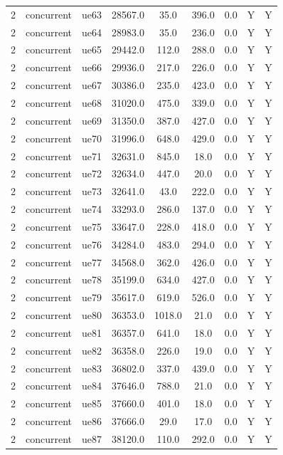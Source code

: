 \begin{table}[ht]
\begin{tabular}{|c|c|c|c|c|c|c|c|c|}
2 & concurrent & ue63 & 28567.0 & 35.0 & 396.0 & 0.0 & Y & Y \\
2 & concurrent & ue64 & 28983.0 & 35.0 & 236.0 & 0.0 & Y & Y \\
2 & concurrent & ue65 & 29442.0 & 112.0 & 288.0 & 0.0 & Y & Y \\
2 & concurrent & ue66 & 29936.0 & 217.0 & 226.0 & 0.0 & Y & Y \\
2 & concurrent & ue67 & 30386.0 & 235.0 & 423.0 & 0.0 & Y & Y \\
2 & concurrent & ue68 & 31020.0 & 475.0 & 339.0 & 0.0 & Y & Y \\
2 & concurrent & ue69 & 31350.0 & 387.0 & 427.0 & 0.0 & Y & Y \\
2 & concurrent & ue70 & 31996.0 & 648.0 & 429.0 & 0.0 & Y & Y \\
2 & concurrent & ue71 & 32631.0 & 845.0 & 18.0 & 0.0 & Y & Y \\
2 & concurrent & ue72 & 32634.0 & 447.0 & 20.0 & 0.0 & Y & Y \\
2 & concurrent & ue73 & 32641.0 & 43.0 & 222.0 & 0.0 & Y & Y \\
2 & concurrent & ue74 & 33293.0 & 286.0 & 137.0 & 0.0 & Y & Y \\
2 & concurrent & ue75 & 33647.0 & 228.0 & 418.0 & 0.0 & Y & Y \\
2 & concurrent & ue76 & 34284.0 & 483.0 & 294.0 & 0.0 & Y & Y \\
2 & concurrent & ue77 & 34568.0 & 362.0 & 426.0 & 0.0 & Y & Y \\
2 & concurrent & ue78 & 35199.0 & 634.0 & 427.0 & 0.0 & Y & Y \\
2 & concurrent & ue79 & 35617.0 & 619.0 & 526.0 & 0.0 & Y & Y \\
2 & concurrent & ue80 & 36353.0 & 1018.0 & 21.0 & 0.0 & Y & Y \\
2 & concurrent & ue81 & 36357.0 & 641.0 & 18.0 & 0.0 & Y & Y \\
2 & concurrent & ue82 & 36358.0 & 226.0 & 19.0 & 0.0 & Y & Y \\
2 & concurrent & ue83 & 36802.0 & 337.0 & 439.0 & 0.0 & Y & Y \\
2 & concurrent & ue84 & 37646.0 & 788.0 & 21.0 & 0.0 & Y & Y \\
2 & concurrent & ue85 & 37660.0 & 401.0 & 18.0 & 0.0 & Y & Y \\
2 & concurrent & ue86 & 37666.0 & 29.0 & 17.0 & 0.0 & Y & Y \\
2 & concurrent & ue87 & 38120.0 & 110.0 & 292.0 & 0.0 & Y & Y \\

\end{tabular}
\end{table}
